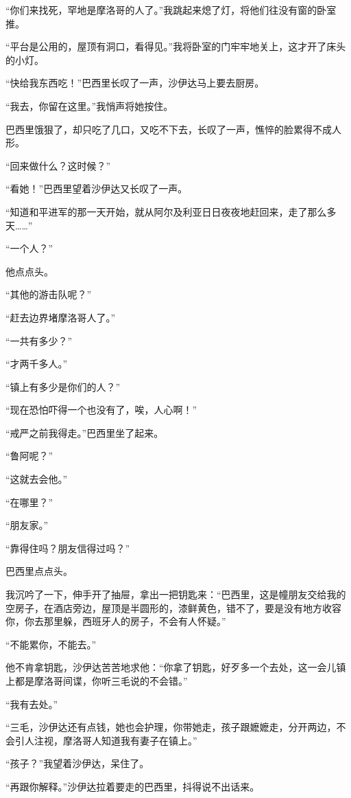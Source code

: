 \par “你们来找死，罕地是摩洛哥的人了。”我跳起来熄了灯，将他们往没有窗的卧室推。
\par “平台是公用的，屋顶有洞口，看得见。”我将卧室的门牢牢地关上，这才开了床头的小灯。
\par “快给我东西吃！”巴西里长叹了一声，沙伊达马上要去厨房。
\par “我去，你留在这里。”我悄声将她按住。
\par 巴西里饿狠了，却只吃了几口，又吃不下去，长叹了一声，憔悴的脸累得不成人形。
\par “回来做什么？这时候？”
\par “看她！”巴西里望着沙伊达又长叹了一声。
\par “知道和平进军的那一天开始，就从阿尔及利亚日日夜夜地赶回来，走了那么多天……”
\par “一个人？”
\par 他点点头。
\par “其他的游击队呢？”
\par “赶去边界堵摩洛哥人了。”
\par “一共有多少？”
\par “才两千多人。”
\par “镇上有多少是你们的人？”
\par “现在恐怕吓得一个也没有了，唉，人心啊！”
\par “戒严之前我得走。”巴西里坐了起来。
\par “鲁阿呢？”
\par “这就去会他。”
\par “在哪里？”
\par “朋友家。”
\par “靠得住吗？朋友信得过吗？”
\par 巴西里点点头。
\par 我沉吟了一下，伸手开了抽屉，拿出一把钥匙来：“巴西里，这是幢朋友交给我的空房子，在酒店旁边，屋顶是半圆形的，漆鲜黄色，错不了，要是没有地方收容你，你去那里躲，西班牙人的房子，不会有人怀疑。”
\par “不能累你，不能去。”
\par 他不肯拿钥匙，沙伊达苦苦地求他：“你拿了钥匙，好歹多一个去处，这一会儿镇上都是摩洛哥间谍，你听三毛说的不会错。”
\par “我有去处。”
\par “三毛，沙伊达还有点钱，她也会护理，你带她走，孩子跟嬷嬷走，分开两边，不会引人注视，摩洛哥人知道我有妻子在镇上。”
\par “孩子？”我望着沙伊达，呆住了。
\par “再跟你解释。”沙伊达拉着要走的巴西里，抖得说不出话来。
